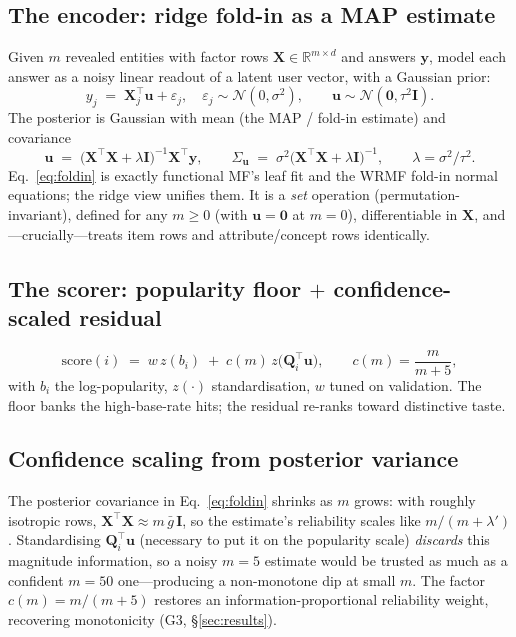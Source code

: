\documentclass[11pt]{article}
\newcommand{\R}{\mathbb{R}}
\newcommand{\Q}{\mathbf{Q}}
\newcommand{\X}{\mathbf{X}}
\newcommand{\uu}{\mathbf{u}}
\newcommand{\yy}{\mathbf{y}}
\newcommand{\I}{\mathbf{I}}
\begin{document}
\subsection{The encoder: ridge fold-in as a MAP estimate}\label{sec:foldin}
Given $m$ revealed entities with factor rows $\X\in\R^{m\times d}$ and answers $\yy$, model each answer as a noisy
linear readout of a latent user vector, with a Gaussian prior:
\begin{equation}
  y_j \;=\; \X_j^\top \uu + \varepsilon_j,\quad \varepsilon_j\sim\mathcal N(0,\sigma^2),\qquad
  \uu\sim\mathcal N(\mathbf 0,\tau^2\I).
\end{equation}
The posterior is Gaussian with mean (the MAP / fold-in estimate) and covariance
\begin{equation}\label{eq:foldin}
  \uu \;=\; \bigl(\X^\top\X + \lambda\I\bigr)^{-1}\X^\top\yy,\qquad
  \Sigma_{\uu} \;=\; \sigma^2\bigl(\X^\top\X+\lambda\I\bigr)^{-1},\qquad \lambda=\sigma^2/\tau^2.
\end{equation}
Eq.~\eqref{eq:foldin} is exactly functional MF's leaf fit and the WRMF fold-in normal equations; the ridge view
unifies them. It is a \emph{set} operation (permutation-invariant), defined for any $m\ge 0$ (with $\uu=\mathbf 0$
at $m{=}0$), differentiable in $\X$, and---crucially---treats item rows and attribute/concept rows identically.

\subsection{The scorer: popularity floor $+$ confidence-scaled residual}
\begin{equation}\label{eq:score}
  \mathrm{score}(i) \;=\; w\,z(b_i) \;+\; c(m)\,z\!\bigl(\Q_i^\top\uu\bigr),\qquad c(m)=\frac{m}{m+5},
\end{equation}
with $b_i$ the log-popularity, $z(\cdot)$ standardisation, $w$ tuned on validation. The floor banks the
high-base-rate hits; the residual re-ranks toward distinctive taste.

\subsection{Confidence scaling from posterior variance}\label{sec:conf}
The posterior covariance in Eq.~\eqref{eq:foldin} shrinks as $m$ grows: with roughly isotropic rows,
$\X^\top\X\approx m\,\bar g\,\I$, so the estimate's reliability scales like $m/(m+\lambda')$. Standardising
$\Q_i^\top\uu$ (necessary to put it on the popularity scale) \emph{discards} this magnitude information, so a noisy
$m{=}5$ estimate would be trusted as much as a confident $m{=}50$ one---producing a non-monotone dip at small $m$.
The factor $c(m)=m/(m+5)$ restores an information-proportional reliability weight, recovering monotonicity (G3,
\S\ref{sec:results}).
\end{document}
